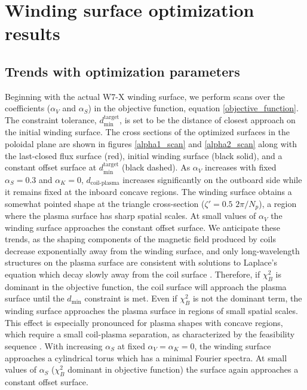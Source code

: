 \documentclass[aps,unsortedaddress]{revtex4-1}
\begin{document}
\section{Winding surface optimization results}
\label{sect_results}

\subsection{Trends with optimization parameters}
\FloatBarrier

Beginning with the actual W7-X winding surface, we perform scans over the coefficients ($\alpha_V$ and $\alpha_S$) in the objective function, equation \ref{objective_function}. The constraint tolerance, $d_{\text{min}}^{\text{target}}$, is set to be the distance of closest approach on the initial winding surface. The cross sections of the optimized surfaces in the poloidal plane are shown in figures \ref{alpha1_scan} and \ref{alpha2_scan} along with the last-closed flux surface (red), initial winding surface (black solid), and a constant offset surface at $d_{\text{min}}^{\text{target}}$ (black dashed). As $\alpha_V$ increases with fixed $\alpha_S = 0.3$ and $\alpha_K = 0$, $d_{\text{coil-plasma}}$ increases significantly on the outboard side while it remains fixed at the inboard concave regions. The winding surface obtains a somewhat pointed shape at the triangle cross-section ($\zeta' = 0.5$ $2\pi/N_p$), a region where the plasma surface has sharp spatial scales. At small values of $\alpha_V$ the winding surface approaches the constant offset surface. We anticipate these trends, as the shaping components of the magnetic field produced by coils decrease exponentially away from the winding surface, and only long-wavelength structures on the plasma surface are consistent with solutions to Laplace's equation which decay slowly away from the coil surface \cite{Boozer2000}. Therefore, if $\chi^2_B$ is dominant in the objective function, the coil surface will approach the plasma surface until the $d_{\text{min}}$ constraint is met. Even if $\chi^2_B$ is not the dominant term, the winding surface approaches the plasma surface in regions of small spatial scales. This effect is especially pronounced for plasma shapes with concave regions, which require a small coil-plasma separation, as characterized by the feasibility sequence \cite{Landreman2016}. With increasing $\alpha_S$ at fixed $\alpha_V = \alpha_K = 0$, the winding surface approaches a cylindrical torus which has a minimal Fourier spectra. At small values of $\alpha_S$ ($\chi^2_B$ dominant in objective function) the surface again approaches a constant offset surface. 
\end{document}
